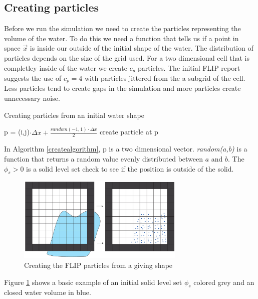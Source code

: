 \subsection{Creating particles}

Before we run the simulation we need to create the particles representing the volume of the water. To do this we need a function that tells us if a point in space $\vec{x}$ is inside our outside of the initial shape of the water. The distribution of particles depends on the size of the grid used. For a two dimensional cell that is completley inside of the water we create $c_p$ particles. The initial FLIP report suggests the use of $c_p = 4$ with particles jittered from the a subgrid of the cell. Less particles tend to create gaps in the simulation and more particles create unnecessary noise. 

\begin{algorithm}
\caption{Creating particles from an initial water shape}
\begin{algorithmic}
\STATE p = (i,j)$\cdot \Delta x +\frac{random(-1,1) \cdot \Delta x}{2}$
\STATE create particle at p
\ENDIF
\ENDFOR
\ENDFOR
\ENDFOR
\end{algorithmic}
\label{createalgorithm}
\end{algorithm}

In Algorithm \ref{createalgorithm}, p is a two dimensional vector. {\it random(a,b)} is a function that returns a random value evenly distributed between $a$ and $b$. The $\phi_s > 0$ is a solid level set check to see if the position is outside of the solid.

\begin{figure}[ht!]
\centering
\includegraphics[width=80mm]{img/create.pdf}
\caption{Creating the FLIP particles from a giving shape}
\label{createexample}
\end{figure}

Figure \ref{createexample} shows a basic example of an initial solid level set $\phi_s$ colored grey and an closed water volume in blue.
